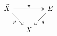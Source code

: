 \documentclass{article}
\begin{document}
    \begin{equation*}
        \begin{tikzcd}[column sep = 0.5cm]
            \widetilde{X} \ar[rr, "\pi", twoheadrightarrow] \ar[dr, "p"'] & & E \ar[dl, "q"] \\
            & X
        \end{tikzcd}
    \end{equation*}
\end{document}
